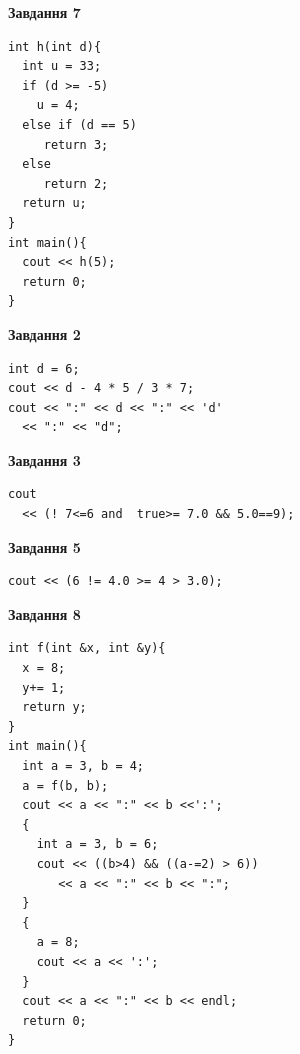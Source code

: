 \documentclass[12pt, ukrainian]{article}
\begin{document}
{\begin {large}
\begin{minipage}[t]{7.0cm}
\begin{center}
\textbf{Завдання 7}
\end{center}
\vspace{-8mm}

\begin{verbatim}
int h(int d){
  int u = 33;
  if (d >= -5)
    u = 4;
  else if (d == 5)
     return 3;
  else
     return 2;
  return u;
}
int main(){
  cout << h(5);
  return 0;
}
\end{verbatim}

\end{minipage}
\vline \hspace{1mm}
\begin{minipage}[t]{11.0cm}

\begin{center}
\textbf{Завдання 2}
\end{center}
\vspace{-8mm}

\begin{verbatim}
int d = 6;
cout << d - 4 * 5 / 3 * 7;
cout << ":" << d << ":" << 'd' 
  << ":" << "d";
\end{verbatim}



\begin{center}
\textbf{Завдання 3}
\end{center}
\vspace{-8mm}

\begin{verbatim}
cout 
  << (! 7<=6 and  true>= 7.0 && 5.0==9);
\end{verbatim}



\begin{center}
\textbf{Завдання 5}
\end{center}
\vspace{-8mm}

\begin{verbatim}
cout << (6 != 4.0 >= 4 > 3.0);
\end{verbatim}



\begin{center}
\textbf{Завдання 8}
\end{center}
\vspace{-8mm}

\begin{verbatim}
int f(int &x, int &y){
  x = 8;
  y+= 1;
  return y;
}
int main(){
  int a = 3, b = 4;
  a = f(b, b);
  cout << a << ":" << b <<':';
  {
    int a = 3, b = 6;
    cout << ((b>4) && ((a-=2) > 6))
       << a << ":" << b << ":";
  }
  {
    a = 8;
    cout << a << ':';
  }
  cout << a << ":" << b << endl;
  return 0;
}
\end{verbatim}


\end{minipage}
\end{large}}
\end{document}
